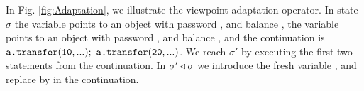 % 



In Fig. \ref{fig:Adaptation}, we illustrate the viewpoint adaptation operator. In state $\sigma$ the variable  points to an 
object with password , and balance ,  the variable  points to an 
object with password , and balance , and the continuation is ${\texttt{a.transfer}}({\texttt{10}},...);$  ${\texttt{a.transfer}}({\texttt{20}},...)$. 
We reach $\sigma'$ by executing the first two statements from the continuation.
In $\sigma' \triangleleft \sigma$ we introduce the fresh variable , and replace  by  in the continuation.


